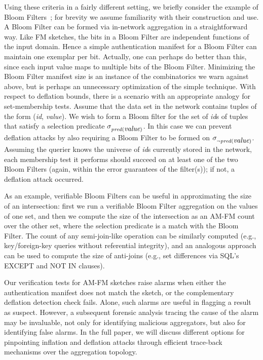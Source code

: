 \documentclass[10pt,twocolumn]{article}
\newcommand{\amfm}{AM-FM\xspace}
\newcommand{\am}{authentication manifest\xspace}
\newcommand{\pred}{\ensuremath{\mathit{pred}}\xspace}
\newcommand\vpar{{\vspace*{0.3em}}}
\newcommand{\stitle}[1]{\vpar\noindent{\bf #1\/}}
\begin{document}
Using these criteria in a fairly different setting, we
briefly consider the example of Bloom Filters~\cite{Bloom1970}; for brevity we assume
familiarity with their construction and use.  A Bloom Filter
can be formed via in-network aggregation in a straightforward way.
Like FM sketches, the bits in a Bloom Filter are independent functions
of the input domain.  Hence a simple \am for a Bloom Filter can
maintain one exemplar per bit.  Actually, one can perhaps do better
than this, since each input value maps to multiple bits of the Bloom
Filter.  Minimizing the Bloom Filter manifest size is an instance of
the combinatorics we warn against above, but is perhaps an unnecessary
optimization of the simple technique.  With respect to deflation
bounds, there is a scenario with an appropriate analogy for set-membership
tests.  Assume that the data set in the network contains
tuples of the form ({\it id}, {\it value}).  We wish to form a Bloom
filter for the set of {\it id}s of tuples that satisfy a selection
predicate $\sigma_{\pred(\mbox{\it value})}$.  In this case
we can prevent deflation attacks by also requiring a Bloom Filter to
be formed on $\sigma_{\neg\pred(\mbox{\it value})}$.  Assuming the
querier knows the universe of {\it id}s currently stored in the
network, each membership test it performs should succeed on at least
one of the two Bloom Filters (again, within the error guarantees of the
filter(s)); if not, a deflation attack occurred.

As an example, verifiable Bloom Filters can be useful in approximating
the size of an intersection: first we run a verifiable Bloom Filter
aggregation on the values of one set, and then we compute the size of
the intersection as an \amfm count over the other set, where
the selection predicate is a match with the Bloom Filter.  The count of any
semi-join-like operation can be similarly computed (e.g.,
key/foreign-key queries without referential integrity), and an
analogous approach can be used to compute the size of anti-joins
(e.g., set differences via SQL's EXCEPT and NOT IN clauses).





\stitle{Verification Failure and Accountability.}
Our verification tests for \amfm sketches raise alarms when either 
the \am does not match the sketch, or the complementary deflation 
detection check fails. 
Alone, such alarms are useful in flagging a result as suspect. 
However, a subsequent forensic analysis tracing the cause of 
the alarm may be invaluable, not only for identifying malicious 
aggregators, but also for identifying false alarms. 
In the full paper, we will discuss different options for pinpointing inflation and 
deflation attacks through efficient trace-back mechanisms over
the aggregation topology.
\end{document}
